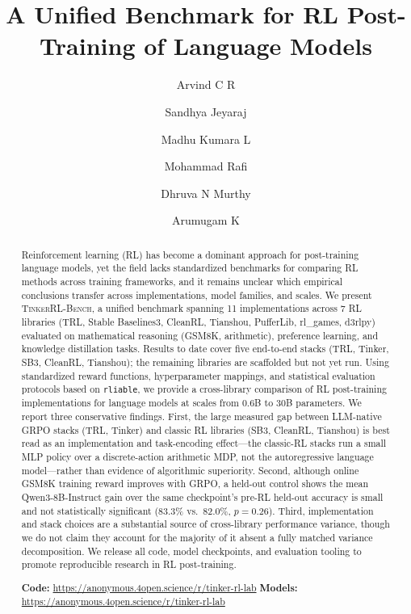 \documentclass[manuscript,review,anonymous]{acmart}
\title{A Unified Benchmark for RL Post-Training of Language Models}
\author{Arvind C R}
\affiliation{%
  \institution{PES University}
  \city{Bangalore}
  \country{India}
}
\author{Sandhya Jeyaraj}
\affiliation{%
  \institution{PES University}
  \city{Bangalore}
  \country{India}
}
\author{Madhu Kumara L}
\affiliation{%
  \institution{PES University}
  \city{Bangalore}
  \country{India}
}
\author{Mohammad Rafi}
\affiliation{%
  \institution{PES University}
  \city{Bangalore}
  \country{India}
}
\author{Dhruva N Murthy}
\affiliation{%
  \institution{PES University}
  \city{Bangalore}
  \country{India}
}
\author{Arumugam K}
\affiliation{%
  \institution{PES University}
  \city{Bangalore}
  \country{India}
}
\newcommand{\ours}{\textsc{TinkerRL-Bench}}
\begin{document}


\begin{abstract}
Reinforcement learning (RL) has become a dominant approach for post-training
language models, yet the field lacks standardized benchmarks for comparing RL
methods across training frameworks, and it remains unclear which empirical
conclusions transfer across implementations, model families, and scales. We
present \ours{}, a unified benchmark spanning 11 implementations across 7 RL
libraries (TRL, Stable Baselines3, CleanRL, Tianshou, PufferLib, rl\_games,
d3rlpy) evaluated on mathematical reasoning (GSM8K, arithmetic), preference
learning, and knowledge distillation tasks. Results to date cover five
end-to-end stacks (TRL, Tinker, SB3, CleanRL, Tianshou); the remaining
libraries are scaffolded but not yet run. Using standardized reward functions,
hyperparameter mappings, and statistical evaluation protocols based on
\texttt{rliable}, we provide a cross-library comparison of RL post-training
implementations for language models at scales from 0.6B to 30B parameters.
We report three conservative findings. First, the large measured gap between
LLM-native GRPO stacks (TRL, Tinker) and classic RL libraries (SB3, CleanRL,
Tianshou) is best read as an implementation and task-encoding effect---the
classic-RL stacks run a small MLP policy over a discrete-action arithmetic MDP,
not the autoregressive language model---rather than evidence of algorithmic
superiority. Second, although online GSM8K training reward improves with GRPO,
a held-out control shows the mean Qwen3-8B-Instruct gain over the same
checkpoint's pre-RL held-out accuracy is small and not statistically
significant (83.3\% vs.\ 82.0\%, $p{=}0.26$). Third, implementation and
stack choices are a substantial source of cross-library performance variance,
though we do not claim they account for the majority of it absent a fully
matched variance decomposition. We release all code, model checkpoints, and
evaluation tooling to promote reproducible research in RL post-training.

\textbf{Code:} \url{https://anonymous.4open.science/r/tinker-rl-lab} \quad
\textbf{Models:} \url{https://anonymous.4open.science/r/tinker-rl-lab}
\end{abstract}
\end{document}
